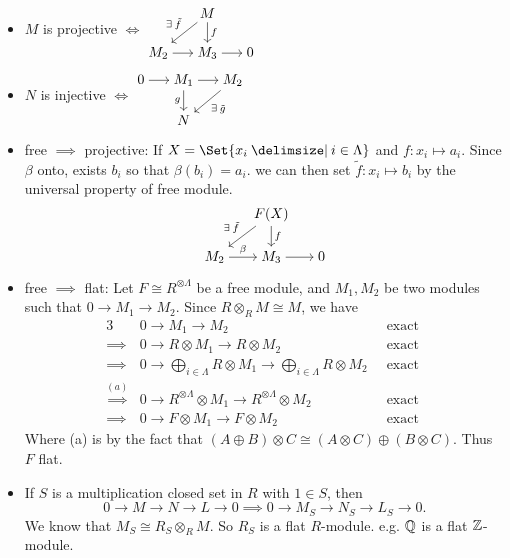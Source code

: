 \begin{fact} \mbox{}
  \begin{itemize}
    \item $M$ is projective $\iff$
      $\begin{tikzcd}[cramped, sep=15pt]
         & M \ar[dl, "\exists \tilde f"'] \ar[d, "f"] \\
        M_2 \ar[r] & M_3 \ar[r] & 0
      \end{tikzcd}$
    \item $N$ is injective $\iff$
      $\begin{tikzcd}[cramped, sep=15pt]
        0 \ar[r] & M_1 \ar[d, "g"'] \ar[r] & M_2 \ar[dl, "\exists \tilde g"] \\
         & N
      \end{tikzcd}$
    \item free $\implies$ projective:
      If $X = \Set{ x_i \given i \in \Lambda}$ and $f: x_i \mapsto a_i$.
      Since $\beta$ onto, exists $b_i$ so that $\beta(b_i) = a_i$.
      we can then set $\tilde f: x_i \mapsto b_i$ by the universal
      property of free module.
      \[\begin{tikzcd}[cramped, sep=15pt]
        & F(X) \ar[dl, "\exists \tilde f"'] \ar[d, "f"] \\
        M_2 \ar[r, "\beta"] & M_3 \ar[r] & 0
      \end{tikzcd}\]
    \item free $\implies$ flat:
      Let $F \cong R^{\otimes \Lambda}$ be a free module,
      and $M_1, M_2$ be two modules such that $0 \to M_1 \to M_2$.
      Since $R \otimes_R M \cong M$, we have
      \begin{alignat*}{3}
        & 0 \to M_1 \to M_2 & \text{ exact } \\
        \implies & 0 \to R \otimes M_1 \to R \otimes M_2 & \text{ exact } \\
        \implies & 0 \to \bigoplus_{i \in \Lambda} R \otimes M_1 \to
        \bigoplus_{i \in \Lambda} R \otimes M_2 \ & \text{ exact } \\
        \stackrel{(a)}{\implies} & 0 \to R^{\otimes \Lambda} \otimes M_1 \to
        R^{\otimes \Lambda} \otimes M_2 & \text{ exact } \\
        \implies & 0 \to F \otimes M_1 \to F \otimes M_2 & \text{ exact }
      \end{alignat*}
      Where (a) is by the fact that $(A \oplus B) \otimes C \cong
      (A\otimes C) \oplus (B \otimes C)$. Thus $F$ flat.

    \item If $S$ is a multiplication closed set in $R$ with $1 \in S$, then
      \[ 0 \to M \to N \to L \to 0 \implies 0 \to M_S \to N_S \to L_S \to 0. \]
      We know that $M_S \cong R_S \otimes_R M$. So $R_S$ is a flat $R$-module.
      e.g. $\mathbb{Q}$ is a flat $\mathbb{Z}$-module.
  \end{itemize}
\end{fact}

